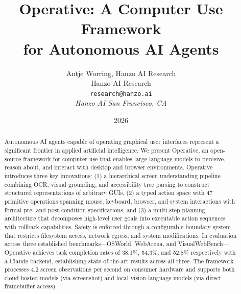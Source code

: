 \documentclass[11pt,twocolumn]{article}
\title{Operative: A Computer Use Framework\\for Autonomous AI Agents}
\author{Antje Worring, Hanzo AI Research \\
Hanzo AI Research\\
\texttt{research@hanzo.ai}\\
\textit{Hanzo AI \quad San Francisco, CA}}
\date{2026}
\begin{document}
\hanzocoverpage

\begin{abstract}
Autonomous AI agents capable of operating graphical user interfaces represent a significant frontier in applied artificial intelligence. We present Operative, an open-source framework for computer use that enables large language models to perceive, reason about, and interact with desktop and browser environments. Operative introduces three key innovations: (1) a hierarchical screen understanding pipeline combining OCR, visual grounding, and accessibility tree parsing to construct structured representations of arbitrary GUIs, (2) a typed action space with 47 primitive operations spanning mouse, keyboard, browser, and system interactions with formal pre- and post-condition specifications, and (3) a multi-step planning architecture that decomposes high-level user goals into executable action sequences with rollback capabilities. Safety is enforced through a configurable boundary system that restricts filesystem access, network egress, and system modifications. In evaluation across three established benchmarks---OSWorld, WebArena, and VisualWebBench---Operative achieves task completion rates of 38.1\%, 54.3\%, and 52.8\% respectively with a Claude backend, establishing state-of-the-art results across all three. The framework processes 4.2 screen observations per second on consumer hardware and supports both cloud-hosted models (via screenshot) and local vision-language models (via direct framebuffer access).
\end{abstract}











\end{document}
